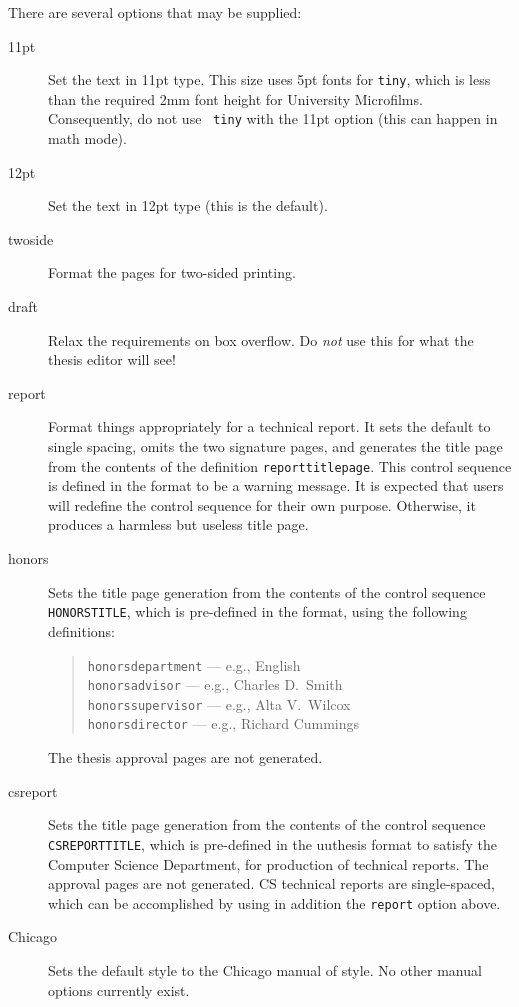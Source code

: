 There are several options that may be supplied:
\begin{description}

\item[11pt] Set the text in 11pt type.
This size uses 5pt fonts for {\tt tiny}, which is less than the required
2mm font height for University Microfilms. Consequently, do not use {\tt
tiny} with the 11pt option (this can happen in math mode).

\item[12pt] Set the text in 12pt type (this is the default).

\item[twoside] Format the pages for two-sided printing.

\item[draft] Relax the requirements on box overflow. Do {\em not\/} use
this for what the thesis editor will see!

\item[report] Format things appropriately for a technical report. It
sets the default to single spacing, omits the two signature pages, and
generates the title page from the contents of the definition
\verb|reporttitlepage|. This control sequence is defined in the format
to be a warning message. It is expected that users will redefine the
control sequence for their own purpose. Otherwise, it produces a
harmless but useless title page.

\item[honors] Sets the title page generation from the contents of the
control sequence \verb|HONORSTITLE|, which is pre-defined in the format,
using the following definitions:
\begin{quote}
{\tt honorsdepartment} --- e.g., English \\
{\tt honorsadvisor} --- e.g., Charles D.\ Smith \\
{\tt honorssupervisor} --- e.g., Alta V.\ Wilcox \\
{\tt honorsdirector} --- e.g., Richard Cummings
\end{quote}
The thesis approval pages are not generated.

\item[csreport] Sets the title page generation from the contents of the
control sequence \verb|CSREPORTTITLE|, which is pre-defined in the
uuthesis format to satisfy the Computer Science Department, for
production of technical reports. The approval pages are not generated.
CS technical reports are single-spaced, which can be accomplished by
using in addition the \verb|report| option above.

\item[Chicago] Sets the default style to the Chicago manual of style.
No other manual options currently exist.
\end{description}



